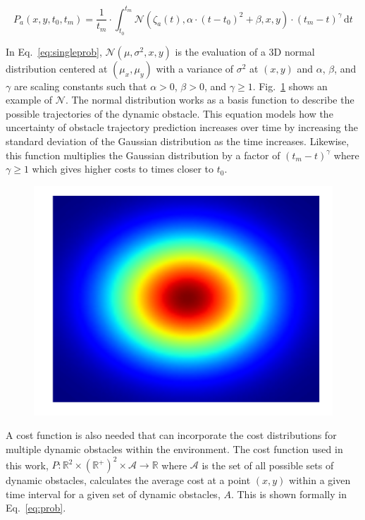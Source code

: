 
\begin{equation}
    P_a(x, y, t_0, t_m) = \frac{1}{t_m} \cdot \int^{t_m}_{t_0}
    \mathcal{N}(\zeta_a(t), \alpha \cdot (t - t_0)^2 + \beta, x, y) \cdot
    (t_m - t)^{\gamma} \,\mathrm{d}t
    \label{eq:singleprob}
\end{equation}

In Eq.~\ref{eq:singleprob}, $\mathcal{N}(\mu, \sigma^2, x, y)$ is the
evaluation of a 3D normal distribution centered at $(\mu_x, \mu_y)$ with a
variance of $\sigma^2$ at $(x, y)$ and $\alpha$, $\beta$, and $\gamma$ are
scaling constants such that $\alpha > 0$, $\beta > 0$, and $\gamma \geq 1$.
Fig.~\ref{fig:normal_3d} shows an example of $\mathcal{N}$. The normal
distribution works as a basis function to describe the possible trajectories of
the dynamic obstacle. This equation models how the uncertainty of obstacle
trajectory prediction increases over time by increasing the standard deviation
of the Gaussian distribution as the time increases.  Likewise, this function
multiplies the Gaussian distribution by a factor of $(t_m - t)^{\gamma}$ where
$\gamma \geq 1$ which gives higher costs to times closer to $t_0$.

\begin{figure}[h!]
    \centering
    \includegraphics[width=0.60\linewidth]{figs/normal_3d}
    \caption{}
    \label{fig:normal_3d}
\end{figure}

A cost function is also needed that can incorporate the cost distributions for
multiple dynamic obstacles within the environment. The cost function used in
this work, $P: \mathbb{R}^2 \times (\mathbb{R}^+)^2 \times \mathcal{A}
\rightarrow \mathbb{R}$ where $\mathcal{A}$ is the set of all possible sets of
dynamic obstacles, calculates the average cost at a point $(x, y)$ within a
given time interval for a given set of dynamic obstacles, $A$. This is shown
formally in Eq.~\ref{eq:prob}.

